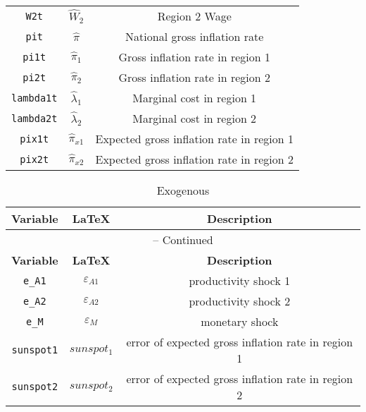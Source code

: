 \begin{center}
\begin{longtable}{ccc}
\texttt{W2t} & ${\hat{W}_{2}}$ & Region 2 Wage\\
\texttt{pit} & ${\hat{\pi}}$ & National gross inflation rate\\
\texttt{pi1t} & ${\hat{\pi}_{1}}$ & Gross inflation rate in region 1\\
\texttt{pi2t} & ${\hat{\pi}_{2}}$ & Gross inflation rate in region 2\\
\texttt{lambda1t} & ${\hat{\lambda}_{1}}$ & Marginal cost in region 1\\
\texttt{lambda2t} & ${\hat{\lambda}_{2}}$ & Marginal cost in region 2\\
\texttt{pix1t} & ${\hat{\pi}_{x1}}$ & Expected gross inflation rate in region 1\\
\texttt{pix2t} & ${\hat{\pi}_{x2}}$ & Expected gross inflation rate in region 2\\
\hline%
\end{longtable}
\end{center}
\begin{center}
\begin{longtable}{ccc}
\caption{Exogenous}\\%
\hline%
\multicolumn{1}{c}{\textbf{Variable}} &
\multicolumn{1}{c}{\textbf{\LaTeX}} &
\multicolumn{1}{c}{\textbf{Description}}\\%
\hline\hline%
\endfirsthead
\multicolumn{3}{c}{{\tablename} \thetable{} -- Continued}\\%
\hline%
\multicolumn{1}{c}{\textbf{Variable}} &
\multicolumn{1}{c}{\textbf{\LaTeX}} &
\multicolumn{1}{c}{\textbf{Description}}\\%
\hline\hline%
\endhead
\texttt{e\_A1} & ${\varepsilon_{A1}}$ & productivity shock 1\\
\texttt{e\_A2} & ${\varepsilon_{A2}}$ & productivity shock 2\\
\texttt{e\_M} & ${\varepsilon_{M}}$ & monetary shock\\
\texttt{sunspot1} & ${sunspot_{1}}$ & error of expected gross inflation rate in region 1\\
\texttt{sunspot2} & ${sunspot_{2}}$ & error of expected gross inflation rate in region 2\\
\hline%
\end{longtable}
\end{center}
